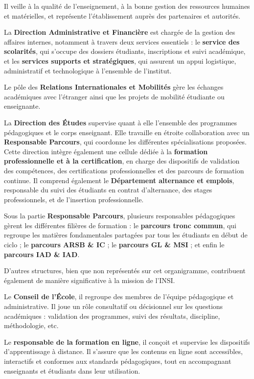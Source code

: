 Il veille à la qualité de l'enseignement, à la bonne gestion des ressources humaines et matérielles, et représente l'établissement auprès des partenaires et autorités.

La \textbf{Direction Administrative et Financière} est chargée de la gestion des affaires internes, notamment à travers deux services essentiels : le \textbf{service des scolarités}, qui s'occupe des dossiers étudiants, inscriptions et suivi académique, et les \textbf{services supports et stratégiques}, qui assurent un appui logistique, administratif et technologique à l'ensemble de l'institut.

Le pôle des \textbf{Relations Internationales et Mobilités} gère les échanges académiques avec l'étranger ainsi que les projets de mobilité étudiante ou enseignante.

La \textbf{Direction des Études} supervise quant à elle l'ensemble des programmes pédagogiques et le corps enseignant. Elle travaille en étroite collaboration avec un \textbf{Responsable Parcours}, qui coordonne les différentes spécialisations proposées. Cette direction intègre également une cellule dédiée à la \textbf{formation professionnelle et à la certification}, en charge des dispositifs de validation des compétences, des certifications professionnelles et des parcours de formation continue. Il comprend également le \textbf{Département alternance et emplois}, responsable du suivi des étudiants en contrat d'alternance, des stages professionnels, et de l'insertion professionnelle.

Sous la partie \textbf{Responsable Parcours}, plusieurs responsables pédagogiques gèrent les différentes filières de formation : le \textbf{parcours tronc commun}, qui regroupe les matières fondamentales partagées par tous les étudiants en début de ciclo ; le \textbf{parcours ARSB \& IC} ; le \textbf{parcours GL \& MSI} ; et enfin le \textbf{parcours IAD \& IAD}.

D'autres structures, bien que non représentés sur cet organigramme, contribuent également de manière significative à la mission de l'INSI.

Le \textbf{Conseil de l'École}, il regroupe des membres de l'équipe pédagogique et administrative. Il joue un rôle consultatif ou décisionnel sur les questions académiques : validation des programmes, suivi des résultats, discipline, méthodologie, etc.

Le \textbf{responsable de la formation en ligne}, il conçoit et supervise les dispositifs d'apprentissage à distance. Il s'assure que les contenus en ligne sont accessibles, interactifs et conformes aux standards pédagogiques, tout en accompagnant enseignants et étudiants dans leur utilisation.

